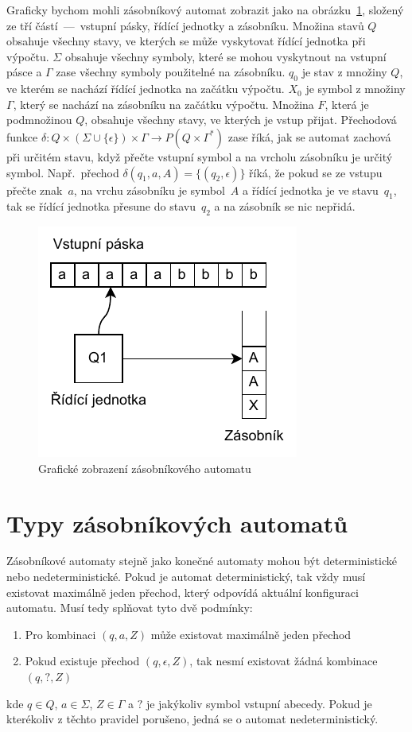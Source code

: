 Graficky bychom mohli zásobníkový automat zobrazit jako na obrázku~\ref{fig:PDAComponents}, složený ze tří částí~---~vstupní pásky, řídící jednotky a zásobníku. Množina stavů $Q$ obsahuje všechny stavy, ve kterých se může vyskytovat řídící jednotka při výpočtu. $\Sigma$ obsahuje všechny symboly, které se mohou vyskytnout na vstupní pásce a $\Gamma$ zase všechny symboly použitelné na zásobníku. $q_0$ je stav z množiny $Q$, ve kterém se nachází řídící jednotka na začátku výpočtu. $X_0$ je symbol z množiny $\Gamma$, který se nachází na zásobníku na začátku výpočtu. Množina $F$, která je podmnožinou $Q$, obsahuje všechny stavy, ve kterých je vstup přijat. Přechodová funkce $\delta : Q \times (\Sigma \cup \{\epsilon\}) \times \Gamma \rightarrow P(Q \times \Gamma^*)$ zase říká, jak se automat zachová při určitém stavu, když přečte vstupní symbol a na vrcholu zásobníku je určitý symbol. Např.\ přechod $\delta(q_1,a,A) = \{(q_2,\epsilon)\}$ říká, že pokud se ze vstupu přečte znak~$a$, na vrchu zásobníku je symbol~$A$ a řídící jednotka je ve stavu~$q_1$, tak se řídící jednotka přesune do stavu~$q_2$ a na zásobník se nic nepřidá.

\begin{figure}[h]
    \centering
    \includegraphics{Figures/PDAComponents.drawio.pdf}
    \caption{Grafické zobrazení zásobníkového automatu}\label{fig:PDAComponents}
\end{figure}

\section{Typy zásobníkových automatů}\label{sec:TypesOfPDA}


Zásobníkové automaty stejně jako konečné automaty mohou být deterministické nebo nedeterministické. Pokud je automat deterministický, tak vždy musí existovat maximálně jeden přechod, který odpovídá aktuální konfiguraci automatu. Musí tedy splňovat tyto dvě podmínky:
\begin{enumerate}
    \item Pro kombinaci $(q,a,Z)$ může existovat maximálně jeden přechod
    \item Pokud existuje přechod $(q,\epsilon,Z)$, tak nesmí existovat žádná kombinace $(q,\mathord{?},Z)$
\end{enumerate}
kde $q \in Q$, $a \in \Sigma$, $Z \in \Gamma$ a $\mathord{?}$ je jakýkoliv symbol vstupní abecedy. Pokud je kterékoliv z těchto pravidel porušeno, jedná se o automat nedeterministický.\cite{Dale2024}

